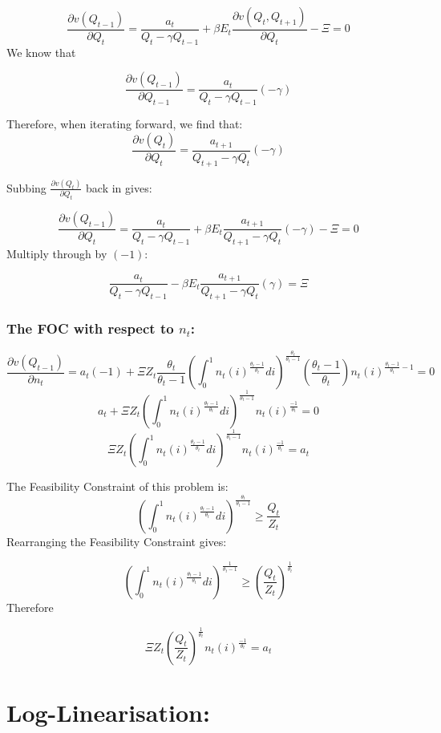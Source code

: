 \documentclass[11pt,preprint, authoryear]{elsarticle}
\numberwithin{equation}{section}
\numberwithin{figure}{section}
\numberwithin{table}{section}
\begin{document}
\[\frac{\partial v(Q_{t-1})}{\partial Q_t} = \frac{a_t}{Q_t-\gamma Q_{t-1}} + \beta E_t\frac{\partial v(Q_t, Q_{t+1})}{\partial Q_t} - \Xi =0\]
We know that

\[\frac{\partial v(Q_{t-1})}{\partial Q_{t-1}} = \frac{a_t}{Q_t-\gamma Q_{t-1}} (-\gamma)\]

Therefore, when iterating forward, we find that:
\[\frac{\partial v(Q_{t})}{\partial Q_{t}} = \frac{a_{t+1}}{Q_{t+1}-\gamma Q_{t}} (-\gamma)\]

Subbing \(\frac{\partial v(Q_{t})}{\partial Q_{t}}\) back in gives:

\[\frac{\partial v(Q_{t-1})}{\partial Q_t} = \frac{a_t}{Q_t-\gamma Q_{t-1}} + \beta E_t\frac{a_{t+1}}{Q_{t+1}-\gamma Q_{t}} (-\gamma) - \Xi =0\]
Multiply through by \((-1)\):

\[ \frac{a_t}{Q_t-\gamma Q_{t-1}} - \beta E_t\frac{a_{t+1}}{Q_{t+1}-\gamma Q_{t}} (\gamma)  = \Xi\]

\hypertarget{the-foc-with-respect-to-n_t}{%
\subsubsection{\texorpdfstring{The FOC with respect to
\(n_t\):}{The FOC with respect to n\_t:}}\label{the-foc-with-respect-to-n_t}}

\[\frac{\partial v(Q_{t-1})}{\partial n_t} = a_t (-1) + \Xi Z_t \frac{\theta_t}{\theta_t -1} (\int_0^1n_t(i)^\frac{\theta_t -1}{\theta_t} di)^\frac{\theta_t}{\theta_t - 1} (\frac{\theta_t -1}{\theta_t}) n_t(i)^{\frac{\theta_t -1}{\theta_t}-1}=0\]
\[ a_t + \Xi Z_t  (\int_0^1n_t(i)^\frac{\theta_t -1}{\theta_t} di)^\frac{1}{\theta_t - 1} n_t(i)^{\frac{-1}{\theta_t}}=0\]
\[  \Xi Z_t  (\int_0^1n_t(i)^\frac{\theta_t -1}{\theta_t} di)^\frac{1}{\theta_t - 1} n_t(i)^{\frac{-1}{\theta_t}}=a_t\]

The Feasibility Constraint of this problem is:
\[(\int_0^1n_t(i)^\frac{\theta_t -1}{\theta_t} di)^\frac{\theta_t}{\theta_t - 1} \ge \frac{Q_t}{Z_t}\]
Rearranging the Feasibility Constraint gives:

\[(\int_0^1n_t(i)^\frac{\theta_t -1}{\theta_t} di)^\frac{1}{\theta_t - 1} \ge (\frac{Q_t}{Z_t})^\frac{1}{\theta_t}\]
Therefore

\[\Xi Z_t (\frac{Q_t}{Z_t})^\frac{1}{\theta_t}n_t(i)^{\frac{-1}{\theta_t}}=a_t\]

\newpage

\hypertarget{log-linearisation}{%
\section{Log-Linearisation:}\label{log-linearisation}}
\end{document}
